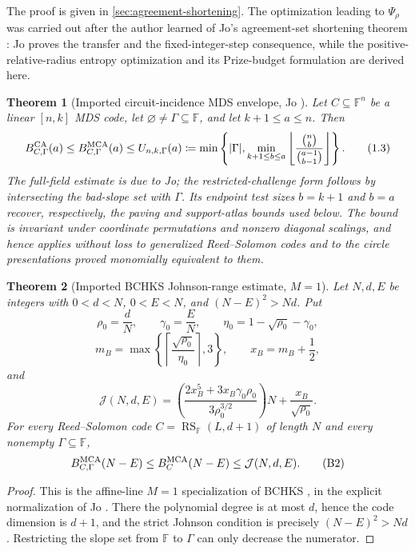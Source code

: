 \documentclass[11pt,a4paper]{amsart}
\numberwithin{equation}{section}
\newtheorem{theorem}{Theorem}[section]
\theoremstyle{remark}
\DeclareMathOperator{\RS}{RS}
\newcommand{\F}{\mathbb F}
\newcommand{\Jcal}{\mathcal J}
\newcommand{\abs}[1]{\lvert #1\rvert}
\newcommand{\floor}[1]{\left\lfloor #1\right\rfloor}
\newcommand{\defeq}{\coloneqq}
\begin{document}
The proof is given in \cref{sec:agreement-shortening}.  The optimization
leading to \(\Psi_\rho\) was carried out after the author learned of Jo's
agreement-set shortening theorem \cite{Jo26}: Jo proves the transfer and the
fixed-integer-step consequence, while the positive-relative-radius entropy
optimization and its Prize-budget formulation are derived here.

\begin{theorem}[Imported circuit-incidence MDS envelope, Jo
  {\cite[Thm.~4.2]{Jo26}}]\label{thm:intro-paving}
Let \(C\subseteq\F^n\) be a linear \([n,k]\) MDS code,
let \(\varnothing\ne\Gamma\subseteq\F\), and let \(k+1\le a\le n\).
Then
\[
 B_{C,\Gamma}^{\rm CA}(a)\le B_{C,\Gamma}^{\rm MCA}(a)
 \le U_{n,k,\Gamma}(a)
 \defeq\min\left\{\abs\Gamma,
 \min_{k+1\le b\le a}
 \floor{\frac{\binom nb}{\binom{a-1}{b-1}}}\right\}.       \tag{1.3}
 \label{eq:intro-paving}
\]
The full-field estimate is due to Jo; the restricted-challenge form follows
by intersecting the bad-slope set with \(\Gamma\).  Its endpoint test sizes
\(b=k+1\) and \(b=a\) recover, respectively, the paving and support-atlas
bounds used below.
The bound is invariant under coordinate permutations and nonzero diagonal
scalings, and hence applies without loss to generalized Reed--Solomon codes
and to the circle presentations proved monomially equivalent to them.
\end{theorem}

\begin{theorem}[Imported BCHKS Johnson-range estimate, \(M=1\)]
\label{thm:bchks-johnson-general}
Let \(N,d,E\) be integers with \(0<d<N\), \(0<E<N\), and
\((N-E)^2>Nd\).  Put
\[
 \rho_0=\frac dN,\qquad \gamma_0=\frac EN,\qquad
 \eta_0=1-\sqrt{\rho_0}-\gamma_0,
\]
\[
 m_B=\max\left\{\left\lceil
       \frac{\sqrt{\rho_0}}{\eta_0}\right\rceil,3\right\},
 \qquad x_B=m_B+\frac12,
\]
and
\[
 \Jcal(N,d,E)=
 \left(\frac{2x_B^5+3x_B\gamma_0\rho_0}
 {3\rho_0^{3/2}}\right)N+\frac{x_B}{\sqrt{\rho_0}}. \tag{B1}
 \label{eq:bchks-johnson-general}
\]
For every Reed--Solomon code \(C=\RS_\F(L,d+1)\) of length \(N\) and
every nonempty \(\Gamma\subseteq\F\),
\[
 B_{C,\Gamma}^{\rm MCA}(N-E)
 \le B_C^{\rm MCA}(N-E)
 \le \Jcal(N,d,E).                                 \tag{B2}
 \label{eq:bchks-johnson-bound}
\]
\end{theorem}

\begin{proof}
This is the affine-line \(M=1\) specialization of
BCHKS \cite[Thm.~4.6]{BCHKS25}, in the explicit normalization of
Jo \cite[Thm.~2.3 and Eqs.~(6)--(9)]{Jo26}.  There the polynomial degree is
at most \(d\), hence the code dimension is \(d+1\), and the strict
Johnson condition is precisely \((N-E)^2>Nd\).  Restricting the slope set
from \(\F\) to \(\Gamma\) can only decrease the numerator.
\end{proof}
\end{document}
